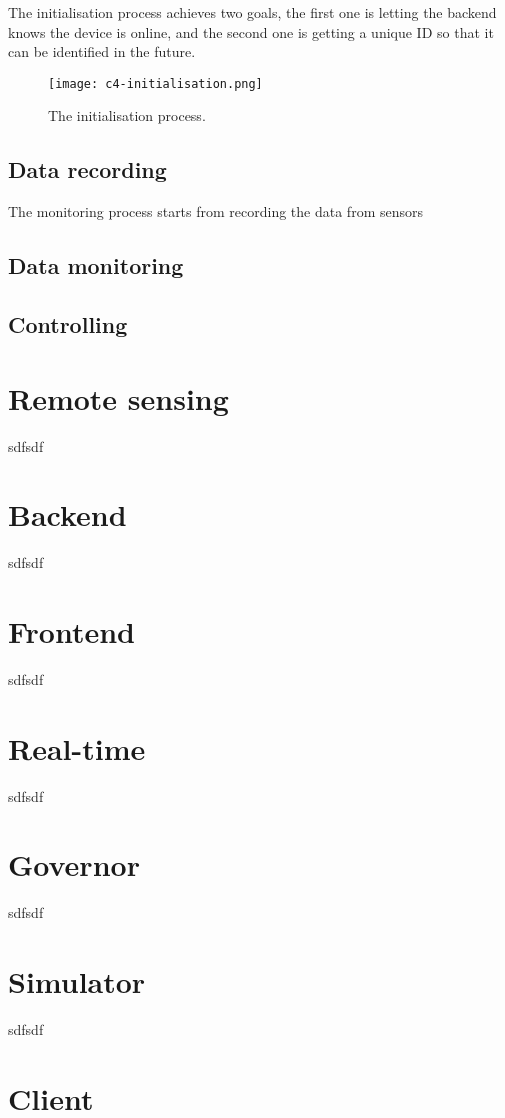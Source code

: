 \documentclass[../thesis.tex]{subfiles}
\begin{document}
The initialisation process achieves two goals, the first one is letting the backend knows the device is online, and the second one is getting a unique ID so that it can be identified in the future. 

\begin{figure}[!ht]
	\centering
	\texttt{[image: c4-initialisation.png]}
	\caption{The initialisation process.}
	\label{fig:init}
\end{figure}

\newpage


\subsection{Data recording}

The monitoring process starts from recording the data from sensors

\subsection{Data monitoring}


\subsection{Controlling}

\newpage
\section{Remote sensing}
\label{sec:remoteSensing}
sdfsdf

\section{Backend}
\label{sec:backend}
sdfsdf
\section{Frontend}
\label{sec:frontend}
sdfsdf
\section{Real-time}
\label{sec:realtime}
sdfsdf
\section{Governor}
\label{sec:governor}
sdfsdf
\section{Simulator}
\label{sec:simulator}
sdfsdf
\section{Client}
\label{sec:webClient}
\end{document}
